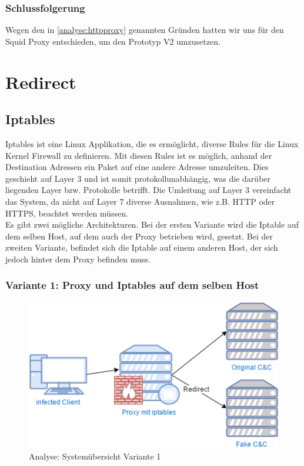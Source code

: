 \subsubsection{Schlussfolgerung}
Wegen den in \ref{analyse:httpproxy} genannten Gründen hatten wir uns für den Squid Proxy entschieden, um den Prototyp V2 umzusetzen.




\section{Redirect}
\label{analyse:redirect}
\subsection{Iptables}
Iptables\cite{Iptables}\cite{wiki:iptables} ist eine Linux Applikation, die es ermöglicht, diverse Rules für die Linux Kernel Firewall zu definieren. Mit diesen Rules ist es möglich, anhand der Destination Adressen ein Paket auf eine andere Adresse umzuleiten. Dies geschieht auf Layer 3 und ist somit protokollunabhängig, was die darüber liegenden Layer bzw. Protokolle betrifft. Die Umleitung auf Layer 3 vereinfacht das System, da nicht auf Layer 7 diverse Ausnahmen, wie z.B. HTTP oder HTTPS, beachtet werden müssen.\\

Es gibt zwei mögliche Architekturen. Bei der ersten Variante wird die Iptable auf dem selben Host, auf dem auch der Proxy betrieben wird, gesetzt. Bei der zweiten Variante, befindet sich die Iptable auf einem anderen Host, der sich jedoch hinter dem Proxy befinden muss.

\subsubsection{Variante 1: Proxy und Iptables auf dem selben Host}

\begin{figure}[H]
	\centering
	\includegraphics[width=\textwidth]{img/Redirect-attached.png}
	\caption{Analyse: Systemübersicht Variante 1}
	\label{fig:Systemübersicht: Variante 1, Proxy und Iptables auf dem selben Host}
\end{figure}


